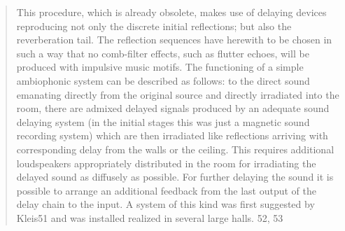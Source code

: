 \begin{quote}
  This procedure, which is already obsolete, makes use of delaying devices
  reproducing not only the discrete initial reflections; but also the
  reverberation tail. The reflection sequences have herewith to be chosen in
  such a way that no comb-filter effects, such as flutter echoes, will be
  produced with impulsive music motifs. The functioning of a simple ambiophonic
  system can be described as follows: to the direct sound emanating directly
  from the original source and directly irradiated into the room, there are
  admixed delayed signals produced by an adequate sound delaying system (in the
  initial stages this was just a magnetic sound recording system) which are
  then irradiated like reflections arriving with corresponding delay from the
  walls or the ceiling. This requires additional loudspeakers appropriately
  distributed in the room for irradiating the delayed sound as diffusely as
  possible. For further delaying the sound it is possible to arrange an additional
  feedback from the last output of the delay chain to the input. A system of this
  kind was first suggested by Kleis51 and was installed realized in several large
  halls. 52, 53 \cite{gb:08}
\end{quote}

